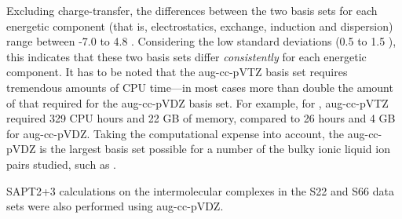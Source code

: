 Excluding charge-transfer, the differences between the two basis sets for each energetic component (that is, electrostatics, exchange, induction and dispersion) range between -7.0 to 4.8 \enUnit.
Considering the low standard deviations  (0.5 to 1.5 \enUnit), this indicates that these two basis sets differ \emph{consistently} for each energetic component. 
It has to be noted that the aug-cc-pVTZ basis set requires tremendous amounts of CPU time---in most cases more than double the amount of that required for the aug-cc-pVDZ basis set.
For example, for , aug-cc-pVTZ required 329 CPU hours and 22 GB of memory, compared to 26  hours and 4 GB for aug-cc-pVDZ. Taking the computational expense into account, the aug-cc-pVDZ is the largest basis set possible for a number of the bulky ionic liquid ion pairs studied, such as .

SAPT2+3 calculations on the intermolecular complexes in the S22 and S66 data sets 
\cite{Jurecka2006a, Takatani2010a, Rezac2011a}
were also performed using aug-cc-pVDZ.
